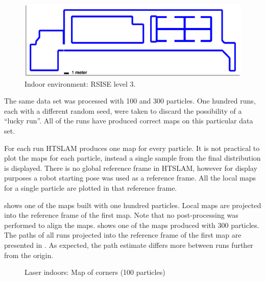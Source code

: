  
\begin{figure}[htbp]
  \centering
  \includegraphics[width=13cm]{Pics/rsise_level3_map}
  \caption{Indoor environment: RSISE level 3.}
  \label{fig:rsise_level3_map}
\end{figure}

The same data set was processed with 100 and 300 particles. One
hundred runs, each with a different random seed, were taken to discard
the possibility of a ``lucky run''. All of the runs have produced
correct maps on this particular data set.

For each run HTSLAM produces one map for every particle. It is not
practical to plot the maps for each particle, instead a single sample
from the final distribution is displayed. There is no global reference
frame in HTSLAM, however for display purposes a robot starting pose was
used as a reference frame. All the local maps for a single particle
are plotted in that reference frame.

 shows one of the maps built with one
hundred particles. Local maps are projected into the reference frame
of the first map. Note that no post-processing was performed to align
the maps.  shows one of the maps
produced with 300 particles. The paths of all runs projected into the
reference frame of the first map are presented in
. As expected, the path estimate differs
more between runs further from the origin.


\begin{figure}[htbp]
  \centering
  \caption{Laser indoors: Map of corners (100 particles)}
  \label{fig:corner_map_100p}
\end{figure}

